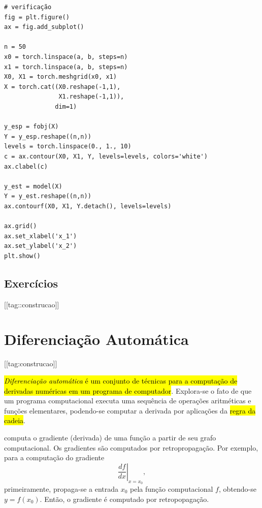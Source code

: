 \begin{lstlisting}
# verificação
fig = plt.figure()
ax = fig.add_subplot()

n = 50
x0 = torch.linspace(a, b, steps=n)
x1 = torch.linspace(a, b, steps=n)
X0, X1 = torch.meshgrid(x0, x1)
X = torch.cat((X0.reshape(-1,1),
               X1.reshape(-1,1)),
              dim=1)

y_esp = fobj(X)
Y = y_esp.reshape((n,n))
levels = torch.linspace(0., 1., 10)
c = ax.contour(X0, X1, Y, levels=levels, colors='white')
ax.clabel(c)

y_est = model(X)
Y = y_est.reshape((n,n))
ax.contourf(X0, X1, Y.detach(), levels=levels)

ax.grid()
ax.set_xlabel('x_1')
ax.set_ylabel('x_2')
plt.show()
\end{lstlisting}

\subsection{Exercícios}

[[tag::construcao]]

\section{Diferenciação Automática}\label{cap_mlp_sec_autograd}

[[tag:construcao]]

\hl{\emph{Diferenciação automática} é um conjunto de técnicas para a computação de derivadas numéricas em um programa de computador}. Explora-se o fato de que um programa computacional executa uma sequência de operações aritméticas e funções elementares, podendo-se computar a derivada por aplicações da \hl{regra da cadeia}.

{\pytorch} computa o gradiente (derivada) de uma função a partir de seu grafo computacional. Os gradientes são computados por retropropagação. Por exemplo, para a computação do gradiente
\begin{equation}
  \left.\frac{d f}{d x}\right|_{x = x_0},
\end{equation}
primeiramente, propaga-se a entrada $x_0$ pela função computacional $f$, obtendo-se $y = f(x_0)$. Então, o gradiente é computado por retropopagação.

